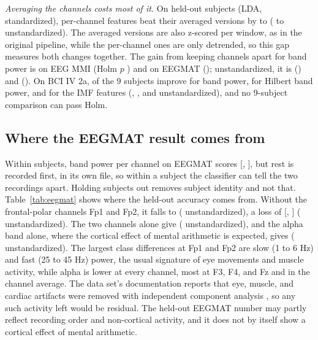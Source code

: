 \emph{Averaging the channels costs most of it.} On held-out subjects (LDA, standardized), per-channel features beat their averaged versions by  to  ( to  unstandardized). The averaged versions are also z-scored per window, as in the original pipeline, while the per-channel ones are only detrended, so this gap measures both changes together. The gain from keeping channels apart for band power is  on EEG MMI (Holm $p$ ) and  on EEGMAT (); unstandardized, it is  () and  (). On BCI IV 2a,  of the 9 subjects improve for band power,  for Hilbert band power, and  for the IMF features (, , and  unstandardized), and no 9-subject comparison can pass Holm.

\subsection{Where the EEGMAT result comes from}

Within subjects, band power per channel on EEGMAT scores  [, ], but rest is recorded first, in its own file, so within a subject the classifier can tell the two recordings apart. Holding subjects out removes subject identity and not that. Table~\ref{tab:eegmat} shows where the held-out accuracy comes from. Without the frontal-polar channels Fp1 and Fp2, it falls to  ( unstandardized), a loss of  [, ] ( unstandardized). The two channels alone give  ( unstandardized), and the alpha band alone, where the cortical effect of mental arithmetic is expected, gives  ( unstandardized). The largest class differences at Fp1 and Fp2 are slow (1 to 6 Hz) and fast (25 to 45 Hz) power, the usual signature of eye movements and muscle activity, while alpha is lower at every channel, most at F3, F4, and Fz and in the channel average. The data set's documentation reports that eye, muscle, and cardiac artifacts were removed with independent component analysis \cite{eegmat}, so any such activity left would be residual. The held-out EEGMAT number may partly reflect recording order and non-cortical activity, and it does not by itself show a cortical effect of mental arithmetic.

